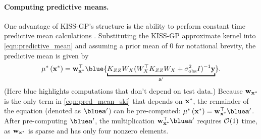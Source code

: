 \paragraph{Computing predictive means.}
One advantage of KISS-GP's structure is the ability to perform constant time predictive mean calculations \cite{wilson2015thoughts}.
Substituting the KISS-GP approximate kernel into \cref{eqn:predictive_mean} and assuming a prior mean of 0 for notational brevity, the predictive mean is given by
\begin{equation}
  \meantest{\bxtest} = \bw_{\bxtest}^\top {\blue{\underbracket{\bK_{\bZ\bZ} \bW_{\bX}(\bW_{\bX}^{\top}\bK_{\bZ\bZ}\bW_{\bX} + \sigma_\text{obs}^{2} \bI)^{-1} \by}_{\ba'}}}.
  \label{eqn:pred_mean_ski}
\end{equation}
(Here {\color{blue} blue} highlights computations that don't depend on test data.)
Because $\mathbf{w}_{\mathbf{x}^{*}}$ is the only term in \cref{eqn:pred_mean_ski} that depends on $\mathbf{x}^{*}$, the remainder of the equation (denoted as $\blue \ba'$) can be pre-computed: $\meantest{\bxtest} = \bw_{\bxtest}^\top \blue \ba'$.
After pre-computing $\blue \ba'$, the multiplication $\bw_{\bxtest}^\top \blue \ba'$ requires $\bigo{1}$ time, as $\mathbf{w}_{\mathbf{x}^*}$ is sparse and has only four nonzero elements.



